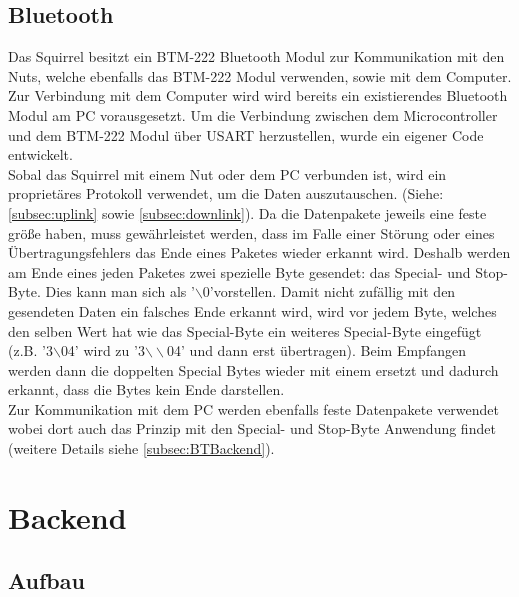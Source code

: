\documentclass[12pt,a4paper]{article}
\begin{document}
\subsection{Bluetooth}
Das Squirrel besitzt ein BTM-222 Bluetooth Modul zur Kommunikation mit den Nuts, welche ebenfalls das BTM-222 Modul verwenden, sowie mit dem Computer. Zur Verbindung mit dem Computer wird wird bereits ein existierendes Bluetooth Modul am PC vorausgesetzt. 
Um die Verbindung zwischen dem Microcontroller und dem BTM-222 Modul über USART herzustellen, wurde ein eigener Code entwickelt.\\
Sobal das Squirrel mit einem Nut oder dem PC verbunden ist, wird ein proprietäres Protokoll verwendet, um die Daten auszutauschen. (Siehe: \ref{subsec:uplink} sowie \ref{subsec:downlink}). Da die Datenpakete jeweils eine feste größe haben, muss gewährleistet werden, dass im Falle einer Störung oder eines Übertragungsfehlers das Ende eines Paketes wieder erkannt wird. Deshalb werden am Ende eines jeden Paketes zwei spezielle Byte gesendet: das Special- und Stop-Byte. Dies kann man sich als '$\backslash$0'vorstellen. Damit nicht zufällig mit den gesendeten Daten ein falsches Ende erkannt wird, wird vor jedem Byte, welches den selben Wert hat wie das Special-Byte ein weiteres Special-Byte eingefügt (z.B. '3$\backslash$04' wird zu '3$\backslash\backslash$04' und dann erst übertragen). Beim Empfangen werden dann die doppelten Special Bytes wieder mit einem ersetzt und dadurch erkannt, dass die Bytes kein Ende darstellen.\\
Zur Kommunikation mit dem PC werden ebenfalls feste Datenpakete verwendet wobei dort auch das Prinzip mit den Special- und Stop-Byte Anwendung findet (weitere Details siehe \ref{subsec:BTBackend}).

\section{Backend}

\subsection{Aufbau}
\end{document}
